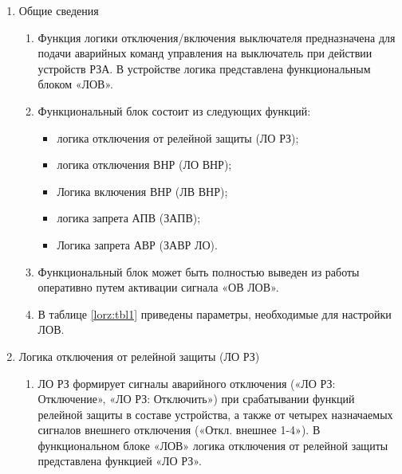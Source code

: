 
\color{black}

\begin{enumerate}

\item Общие сведения

\begin{enumerate}

\item
Функция логики отключения/включения выключателя предназначена для подачи аварийных команд управления на выключатель при действии устройств РЗА. В устройстве логика представлена функциональным блоком «ЛОВ».

\item
Функциональный блок состоит из следующих функций:
\begin{itemize}
\item логика отключения от релейной защиты (ЛО РЗ); 
\item логика отключения ВНР (ЛО ВНР);
\item Логика включения ВНР (ЛВ ВНР);
\item логика запрета АПВ (ЗАПВ);
\item Логика запрета АВР (ЗАВР ЛО).
\end{itemize}

\item
Функциональный блок может быть полностью выведен из работы оперативно путем активации сигнала «ОВ ЛОВ».

\item
В таблице \ref{lorz:tbl1} приведены параметры, необходимые для настройки ЛОВ.

\end{enumerate}


\item Логика отключения от релейной защиты (ЛО РЗ)

\begin{enumerate}

\item
ЛО РЗ формирует сигналы аварийного отключения («ЛО РЗ: Отключение», «ЛО РЗ: Отключить») при срабатывании функций релейной защиты в составе устройства, а также от четырех назначаемых сигналов внешнего отключения («Откл. внешнее 1-4»). В функциональном блоке «ЛОВ» логика отключения от релейной защиты представлена функцией «ЛО РЗ».


\end{enumerate}
\end{enumerate}
